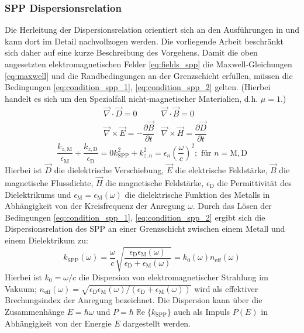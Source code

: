\documentclass[titlepage,  ngerman]{article}
\renewcommand{\Re}{\operatorname{\mathbb{R}e}}
\begin{document}
	\subsubsection{SPP Dispersionsrelation}
	Die Herleitung der Dispersionsrelation orientiert sich an den Ausführungen in \cite[pp.~261--ff]{Fox.2020} und kann dort im Detail nachvollzogen werden. Die vorliegende Arbeit beschränkt sich daher auf eine kurze Beschreibung des Vorgehens. Damit die oben angesetzten elektromagnetischen Felder \eqref{eq:fields_spp}  die Maxwell-Gleichungen \eqref{eq:maxwell} und die Randbedingungen an der Grenzschicht erfüllen, müssen die Bedingungen \eqref{eq:condition_spp_1},  \eqref{eq:condition_spp_2} gelten. (Hierbei handelt es sich um den Spezialfall nicht-magnetischer Materialien, d.h. $\mu = 1$.)
	\begin{align}
		\label{eq:maxwell}	
		&\vec{\nabla}\cdot\vec{D} = 0		&\vec{\nabla}\cdot\vec{B} = 0 \\
		&\vec{\nabla}\times\vec{E} = -\dfrac{\partial\vec{B}}{\partial t} 
		&\vec{\nabla}\times\vec{H} = 	\dfrac{\partial\vec{D}}{\partial t}\nonumber
	\end{align}
	\begin{subequations}
		\begin{equation}
			\label{eq:condition_spp_1}
			\dfrac{k_{z, \mathrm{M}}}{\epsilon_\mathrm{M}} + \dfrac{k_{z, \mathrm{D}}}{\epsilon_\mathrm{D}} = 0
		\end{equation}		
		\begin{equation}
			\label{eq:condition_spp_2}
			k_{\mathrm{SPP}}^2 +k_{z, n}^2 = \epsilon_n\left(\dfrac{\omega}{c}\right)^2; \text{ für  } n=\mathrm{M,D}
		\end{equation}
	\end{subequations}
	Hierbei ist $\vec{D}$ die dielektrische Verschiebung, $\vec{E}$ die elektrische Feldstärke, $\vec{B}$ die magnetische Flussdichte, $\vec{H}$ die magnetische Feldstärke, 	$\epsilon_\mathrm{D}$ die Permittivität des Dielektrikums und $\epsilon_\mathrm{M} = \epsilon_\mathrm{M}(\omega)$ die dielektrische Funktion des Metalls in Abhängigkeit von der Kreisfrequenz der Anregung $\omega$. Durch das Lösen der Bedingungen \eqref{eq:condition_spp_1},  \eqref{eq:condition_spp_2} ergibt sich die Dispersionsrelation des SPP an einer Grenzschicht zwischen einem Metall und einem Dielektrikum zu: 
	\begin{equation}
		\label{eq:dispersion_spp}
		\boxed{
			k_{\mathrm{SPP}}\left(\omega\right) = \dfrac{\omega}{c} \sqrt{\dfrac{\epsilon_\mathrm{D}\epsilon_\mathrm{M}(\omega)}{\epsilon_\mathrm{D} + 	\epsilon_\mathrm{M}(\omega)}}  = k_0(\omega) n_{\mathrm{eff}}(\omega)}
	\end{equation}
	Hierbei ist $k_0 = \omega / c$ die Dispersion von elektromagnetischer Strahlung im Vakuum; $n_{\mathrm{eff}}(\omega) = \sqrt{\epsilon_\mathrm{D}\epsilon_\mathrm{M}(\omega)/(\epsilon_\mathrm{D} + 	\epsilon_\mathrm{M}(\omega))}$ wird als effektiver Brechungsindex der Anregung bezeichnet. Die Dispersion kann über die Zusammenhänge $E = \hbar \omega$ und $P = \hbar \Re\{k_\mathrm{SPP}\}$ auch als Impuls $P(E)$ in Abhängigkeit von der Energie $E$ dargestellt werden.
	
\end{document}
